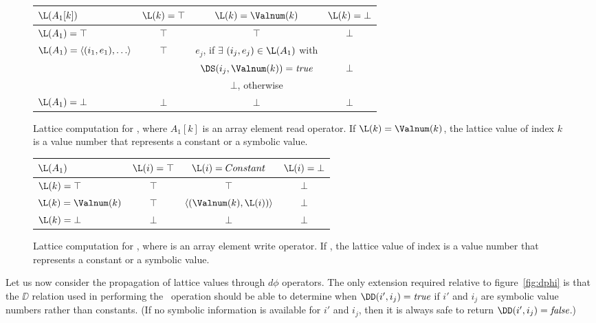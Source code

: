 \begin{figure}%
\begin{center}
\begin{tabular}{|l||c|c|c|}
\hline
$\L(A_1[k])$ & $\L(k) = \top$ & $\L(k) = \Valnum(k)$ & $\L(k) = \bot$ \\
\hline \hline
$\L(A_1) = \top$ & $\top$ & $\top$ & $\bot$ \\
\hline
$\L(A_1) = \langle (i_1,e_1), \ldots \rangle$ & $\top$ & $e_j$, 
if $\exists$
$(i_j,e_j) \in \L(A_1)$ with &\\
& & $\DS(i_j, \Valnum(k)) = \mbox{\it true}$ & $\bot$\\
& & $\bot$, otherwise & \\
\hline
$\L(A_1) = \bot$ & $\bot$ & $\bot$ & $\bot$ \\
\hline
\end{tabular}
\end{center}
\caption{Lattice computation for ,
where $A_1[k]$ is an 
array element read operator. If $\L(k)=\Valnum(k)$, the lattice value of index $k$ is a value number that represents a constant or a symbolic value.}
\label{fig:symb-aref}
\end{figure}

\begin{figure}%
\begin{center}
\begin{tabular}{|l||c|c|c|}
\hline
$\L(A_1)$ & $\L(i) = \top$ & $\L(i) = Constant$ & $\L(i) = \bot$ \\
\hline \hline
$\L(k) = \top$ & $\top$ & $\top$ & $\bot$ \\
\hline
$\L(k) = \Valnum(k)$ & $\top$ & $\langle(\Valnum(k),\L(i))\rangle$ & $\bot$ \\
\hline
$\L(k) = \bot$ & $\bot$ & $\bot$ & $\bot$ \\
\hline
\end{tabular}
\end{center}
\caption{Lattice computation for ,
where  is an 
array element write operator. If , the lattice value of index  is a value number that represents a constant or a symbolic value.}
\label{fig:symb-adef}
\end{figure}





Let us now consider
the propagation of lattice values through $d\phi$
operators.
The only extension required  relative to figure~\ref{fig:dphi} is that
the $\DD$ relation used in performing
the \Update\ operation should be able to determine when
$\DD(i',i_j)=\mbox{\it true}$ if $i'$ and $i_j$ are symbolic
value numbers rather
than constants.  (If no symbolic information is available for $i'$
and $i_j$, then it is always safe
to return $\DD(i',i_j)=\mbox{\it false}$.)

